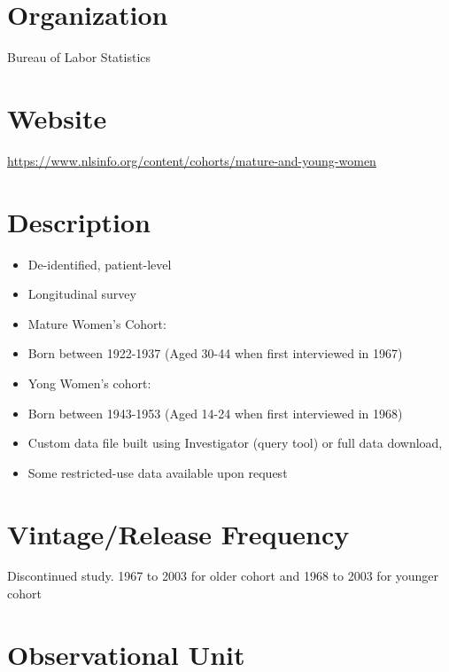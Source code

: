 \documentclass[
]{book}
\providecommand{\tightlist}{%
  \setlength{\itemsep}{0pt}\setlength{\parskip}{0pt}}
\begin{document}
\hypertarget{organization-56}{%
\section{Organization}\label{organization-56}}

Bureau of Labor Statistics

\hypertarget{website-56}{%
\section{Website}\label{website-56}}

\url{https://www.nlsinfo.org/content/cohorts/mature-and-young-women}

\hypertarget{description-56}{%
\section{Description}\label{description-56}}

\begin{itemize}
\tightlist
\item
  De-identified, patient-level
\item
  Longitudinal survey
\item
  Mature Women's Cohort:
\item
  Born between 1922-1937 (Aged 30-44 when first interviewed in 1967)
\item
  Yong Women's cohort:
\item
  Born between 1943-1953 (Aged 14-24 when first interviewed in 1968)
\item
  Custom data file built using Investigator (query tool) or full data download,
\item
  Some restricted-use data available upon request
\end{itemize}

\hypertarget{vintagerelease-frequency-56}{%
\section{Vintage/Release Frequency}\label{vintagerelease-frequency-56}}

Discontinued study. 1967 to 2003 for older cohort and 1968 to 2003 for younger cohort

\hypertarget{observational-unit-56}{%
\section{Observational Unit}\label{observational-unit-56}}
\end{document}
